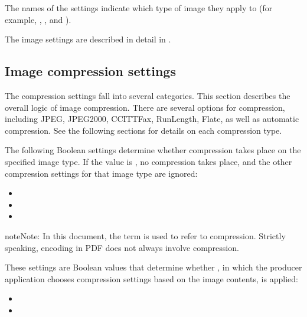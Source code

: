 \documentclass[letterpaper,12pt,english,openany,oneside]{sphinxmanual}
\begin{document}
The names of the settings indicate which type of image they apply to (for example,  ,  , and  ).

The image settings are described in detail in .




\subsection{Image compression settings}
\label{\detokenize{PDF_Create_UsingSettings:image-compression-settings}}
The compression settings fall into several categories. This section describes the overall logic of image compression. There are several options for compression, including JPEG, JPEG2000, CCITTFax, RunLength, Flate, as well as automatic compression. See the following sections for details on each compression type.

The following Boolean settings determine whether compression takes place on the specified image type. If the value is  , no compression takes place, and the other compression settings for that image type are ignored:
\begin{itemize}
\item {} 

\item {} 

\item {} 

\end{itemize}

\begin{sphinxadmonition}{note}{Note:}
In this document, the term  is used to refer to compression. Strictly speaking, encoding in PDF does not always involve compression.
\end{sphinxadmonition}

These settings are Boolean values that determine whether  , in which the producer application chooses compression settings based on the image contents, is applied:
\begin{itemize}
\item {} 

\item {} 

\end{itemize}
\end{document}
